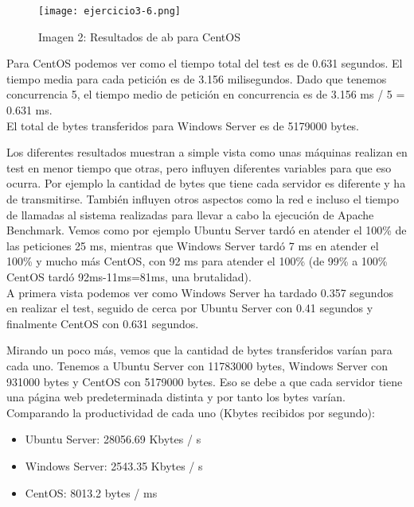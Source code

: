 \begin{itemize}
			\begin{figure}[H] 
				\centering
				\texttt{[image: ejercicio3-6.png]} 
				\label{figura18} 
				\caption{Imagen 2: Resultados de ab para CentOS}
			\end{figure}
			
			Para CentOS podemos ver como el tiempo total del test es de 0.631 segundos. El tiempo media para cada petición es de 3.156 milisegundos. Dado que tenemos concurrencia 5, el tiempo medio de petición en concurrencia es de 3.156 ms / 5 = 0.631 ms.\\
			El total de bytes transferidos para Windows Server es de 5179000 bytes.
			
	\end{itemize}

	Los diferentes resultados muestran a simple vista como unas máquinas realizan en test en menor tiempo que otras, pero influyen diferentes variables para que eso ocurra. Por ejemplo la cantidad de bytes que tiene cada servidor es diferente y ha de transmitirse. También influyen otros aspectos como la red e incluso el tiempo de llamadas al sistema realizadas para llevar a cabo la ejecución de Apache Benchmark. Vemos como por ejemplo Ubuntu Server tardó en atender el 100\% de las peticiones 25 ms, mientras que Windows Server tardó 7 ms en atender el 100\% y mucho más CentOS, con 92 ms para atender el 100\% (de 99\% a 100\% CentOS tardó 92ms-11ms=81ms, una brutalidad). \\
	
	A primera vista podemos ver como Windows Server ha tardado 0.357 segundos en realizar el test, seguido de cerca por Ubuntu Server con 0.41 segundos y finalmente CentOS con 0.631 segundos.
	
	Mirando un poco más, vemos que la cantidad de bytes transferidos varían para cada uno. Tenemos a Ubuntu Server con 11783000 bytes, Windows Server con 931000 bytes y CentOS con 5179000 bytes. Eso se debe a que cada servidor tiene una página web predeterminada distinta y por tanto los bytes varían.\\
	Comparando la productividad de cada uno (Kbytes recibidos por segundo):
	\begin{itemize}
		\item Ubuntu Server: 28056.69 Kbytes / s
		\item Windows Server: 2543.35 Kbytes / s
		\item CentOS: 8013.2 bytes / ms
	\end{itemize}
	
